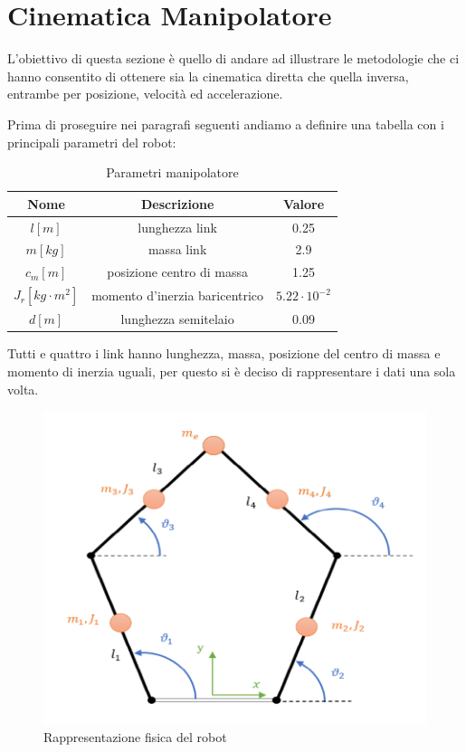 \section{Cinematica Manipolatore}
L'obiettivo di questa sezione è quello di andare ad illustrare le metodologie che ci hanno consentito di ottenere sia la cinematica diretta che quella inversa, entrambe per posizione, velocità ed accelerazione.
\par Prima di proseguire nei paragrafi seguenti andiamo a definire una tabella con i principali parametri del robot:
\begin{table}[h!]
\centering
\begin{tabular}{|c |c |c|} 
 \hline
 Nome & Descrizione  & Valore \\ [0.5ex] 
 \hline\hline
 $l [m]$ & lunghezza link  & 0.25 \\ 
 $m [kg]$ & massa link & 2.9 \\
 $c_m [m]$ & posizione centro di massa & 1.25 \\
 $J_r [kg\cdot m^2]$ & momento d'inerzia baricentrico & $5.22\cdot 10^{-2}$ \\
 $d [m]$ & lunghezza semitelaio & 0.09 \\
 \hline
\end{tabular}
\caption{Parametri manipolatore}
\label{table:1}
\end{table}
Tutti e quattro i link hanno lunghezza, massa, posizione del centro di massa e momento di inerzia uguali, per questo si è deciso di rappresentare i dati una sola volta.
\begin{figure}[ht]
\begin{center}
    \includegraphics[scale=0.6]{Immagini/Robot2.png}
    \caption{Rappresentazione fisica del robot \label{fig:Robot1}}
\end{center}
\end{figure}
